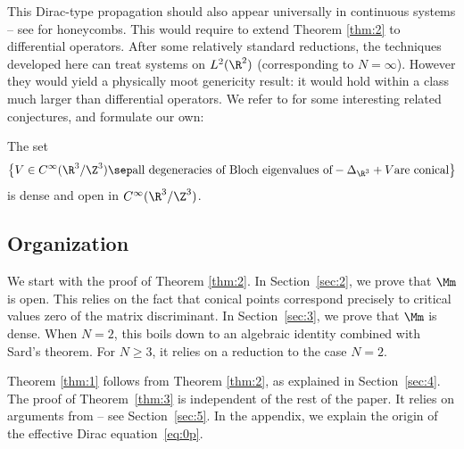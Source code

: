 This Dirac-type propagation should also appear universally in continuous systems -- see \eg \cite{RH08,FLW16,D19a,DW19} for honeycombs. This would require to extend Theorem \ref{thm:2} to differential operators. After some relatively standard reductions, the techniques developed here can treat systems on $L^2(\R^2)$ (corresponding to $N = \infty$). However they would yield a physically moot genericity result: it would hold within a class much larger than differential operators. We refer to \cite{C91,K16} for some interesting related conjectures, and formulate our own:

\begin{conj} The set
\begin{equation*}
\bigl\{ V \in C^\infty(\R^3/\Z^3) \sep \text{all degeneracies of Bloch eigenvalues of} -\Delta_{\R^3}+V \text{are conical}\bigr\}
\end{equation*}
is dense and open in $C^\infty(\R^3/\Z^3)$.
\end{conj}

\subsection{Organization} We start with the proof of Theorem \ref{thm:2}. In Section~\ref{sec:2}, we prove that $\Mm$ is open. This relies on the fact that conical points correspond precisely to critical values zero of the matrix discriminant.
In Section~\ref{sec:3}, we prove that $\Mm$ is dense. When $N=2$, this boils down to an algebraic identity combined with Sard's theorem. For $N \geq 3$, it relies on a reduction to the case $N=2$.

Theorem \ref{thm:1} follows from Theorem \ref{thm:2}, as explained in Section~\ref{sec:4}. The proof of Theorem~\ref{thm:3} is independent of the rest of the paper. It relies on arguments from \cite{D19b} -- see Section~\ref{sec:5}. In the appendix, we explain the origin of the effective Dirac equation~\eqref{eq:0p}.

